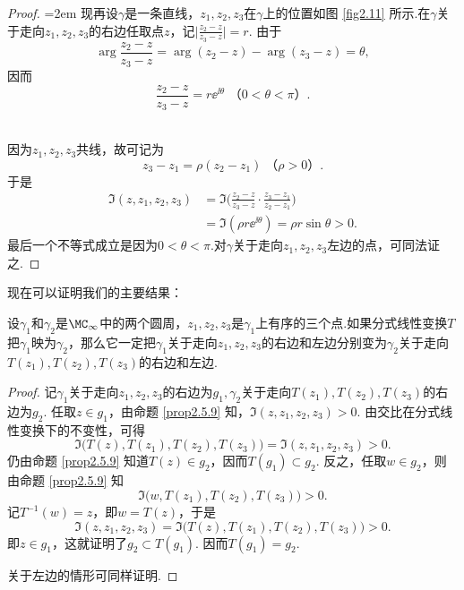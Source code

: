 \begin{proof}
  \noindent\begin{minipage}[b]{0.3\textwidth}
    \centering
  \end{minipage}
  \begin{minipage}[b]{0.7\textwidth}\parindent=2em
    现再设$\gamma$是一条直线，$z_1,z_2,z_3$在$\gamma$上的位置如图 \ref{fig2.11} 所示.在$\gamma$关于走向$z_1,z_2,z_3$的右边任取点$z$，记$\bigg|\frac{z_2-z}{z_3-z}\bigg|=r$. 由于
    \[
      \arg\frac{z_2-z}{z_3-z} = \arg(z_2-z)-\arg(z_3-z) = \theta,
    \]
    因而
    \[
      \frac{z_2-z}{z_3-z} = r\ee^{\ii\theta}\,\,\mbox{（$0<\theta<\pi$）}.
    \]
  \end{minipage}\\
  因为$z_1,z_2,z_3$共线，故可记为
  \[
    z_3 - z_1 = \rho(z_2-z_1)\;\mbox{（$\rho>0$）}.
  \]
  于是
  \begin{align*}
    \Im(z,z_1,z_2,z_3) & = \Im\bigg( \frac{z_2-z}{z_3-z} \cdot \frac{z_3-z_1}{z_2-z_1} \bigg)\\
    & = \Im( \rho r\ee^{\ii\theta}) = \rho r\sin\theta > 0.
  \end{align*}
  最后一个不等式成立是因为$0<\theta<\pi$.对$\gamma$关于走向$z_1,z_2,z_3$左边的点，可同法证之.
\end{proof}


现在可以证明我们的主要结果：
\begin{theorem}\label{thm2.5.10}
  设$\gamma_1$和$\gamma_2$是$\MC_\infty$中的两个圆周，$z_1,z_2,z_3$是$\gamma_1$上有序的三个点.如果分式线性变换$T$把$\gamma_1$映为$\gamma_2$，那么它一定把$\gamma_1$关于走向$z_1,z_2,z_3$的右边和左边分别变为$\gamma_2$关于走向$T(z_1),T(z_2),T(z_3)$的右边和左边.
\end{theorem}
\begin{proof}
  记$\gamma_1$关于走向$z_1,z_2,z_3$的右边为$g_1,\gamma_2$关于走向$T(z_1),T(z_2),T(z_3)$的右边为$g_2$. 任取$z\in g_1$，由命题 \ref{prop2.5.9} 知，$\Im(z,z_1,z_2,z_3)>0$. 由交比在分式线性变换下的不变性，可得
  \[
    \Im\big(T(z),T(z_1),T(z_2),T(z_3)\big) = \Im(z,z_1,z_2,z_3)>0.
  \]
  仍由命题 \ref{prop2.5.9} 知道$T(z)\in g_2$，因而$T(g_1)\subset g_2$. 反之，任取$w\in g_2$，则由命题 \ref{prop2.5.9} 知
  \[
    \Im\big( w,T(z_1),T(z_2),T(z_3) \big) > 0.
  \]
  记$T^{-1}(w)=z$，即$w=T(z)$，于是
  \[
    \Im(z,z_1,z_2,z_3) = \Im\big( T(z),T(z_1),T(z_2),T(z_3) \big) > 0.
  \]
  即$z\in g_1$，这就证明了$g_2\subset T(g_1)$. 因而$T(g_1)=g_2$.

  关于左边的情形可同样证明.
\end{proof}

